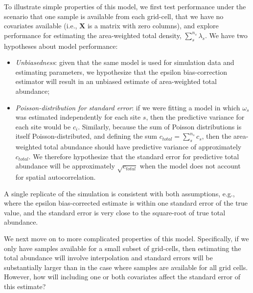 To illustrate simple properties of this model, we first test performance under the scenario that one sample is available from each grid-cell, that we have no covariates available (i.e., \(\mathbf{X}\) is a matrix with zero columns), and explore performance for estimating the area-weighted total density, \(\sum_s^{n_s} \lambda_s \).  We have two hypotheses about model performance:
\begin{itemize}
    \item \textit{Unbiasedness}:  given that the same model is used for simulation data and estimating parameters, we hypothesize that the epsilon bias-correction estimator will result in an unbiased estimate of area-weighted total abundance;

    \item \textit{Poisson-distribution for standard error}:  if we were fitting a model in which \(\omega_s\) was estimated independently for each site \(s\), then the predictive variance for each site would be \(c_i\).  Similarly, because the sum of Poisson distributions is itself Poisson-distributed, and defining the sum \(  c_{total} = \sum_s^{n_s} c_s \), then the area-weighted total abundance should have predictive variance of approximately \( c_{total} \).  We therefore hypothesize that the standard error for predictive total abundance will be approximately \(\sqrt{c_{total}}\) when the model does not account for spatial autocorrelation.
\end{itemize}
A single replicate of the simulation is consistent with both assumptions, e.g., where the epsilon bias-corrected estimate is within one standard error of the true value, and the standard error is very close to the square-root of true total abundance.

%
\lstset{style=Routput}


We next move on to more complicated properties of this model.  Specifically, if we only have samples available for a small subset of grid-cells, then estimating the total abundance will involve interpolation and standard errors will be substantially larger than in the case where samples are available for all grid cells.  However, how will including one or both covariates affect the standard error of this estimate?

